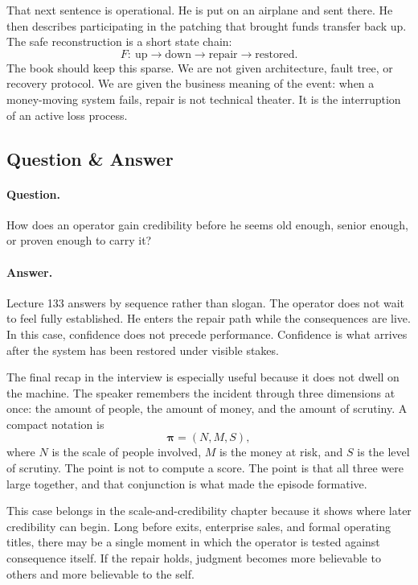 \documentclass[11pt,oneside]{book}
\begin{document}
That next sentence is operational. He is put on an airplane and sent there. He then describes participating in the patching that brought funds transfer back up. The safe reconstruction is a short state chain:
\[
F:\ \text{up} \rightarrow \text{down} \rightarrow \text{repair} \rightarrow \text{restored}.
\]
The book should keep this sparse. We are not given architecture, fault tree, or recovery protocol. We are given the business meaning of the event: when a money-moving system fails, repair is not technical theater. It is the interruption of an active loss process.

\subsection{Question \& Answer}

\paragraph{Question.}
How does an operator gain credibility before he seems old enough, senior enough, or proven enough to carry it?

\paragraph{Answer.}
Lecture 133 answers by sequence rather than slogan. The operator does not wait to feel fully established. He enters the repair path while the consequences are live. In this case, confidence does not precede performance. Confidence is what arrives after the system has been restored under visible stakes.

The final recap in the interview is especially useful because it does not dwell on the machine. The speaker remembers the incident through three dimensions at once: the amount of people, the amount of money, and the amount of scrutiny. A compact notation is
\[
\boldsymbol{\pi}=(N,M,S),
\]
where \(N\) is the scale of people involved, \(M\) is the money at risk, and \(S\) is the level of scrutiny. The point is not to compute a score. The point is that all three were large together, and that conjunction is what made the episode formative.

This case belongs in the scale-and-credibility chapter because it shows where later credibility can begin. Long before exits, enterprise sales, and formal operating titles, there may be a single moment in which the operator is tested against consequence itself. If the repair holds, judgment becomes more believable to others and more believable to the self.
\end{document}
